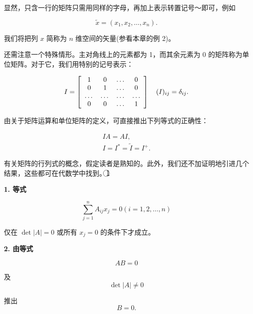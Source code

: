 显然，只含一行的矩阵只需用同样的字母，再加上表示转置记号～即可，例如

\begin{equation*}
\widetilde {x} = \left(x _ {1}, x _ {2}, \dots , x _ {n}\right).
\end{equation*}

我们将把列 $x$ 简称为 $n$ 维空间的矢量(参看本章的例 2)。

还需注意一个特殊情形。主对角线上的元素都为 1，而其余元素为 0 的矩阵称为单位矩阵。对于它，我们用特别的记号表示：

\begin{equation*}
I = \left[ \begin{array}{c c c c} 1 & 0 & \dots & 0 \\ 0 & 1 & \dots & 0 \\ \dots & \dots & \dots & \dots \\ 0 & 0 & \dots & 1 \end{array} \right] \quad (I) _ {i j} = \delta_ {i j}.
\end{equation*}

由关于矩阵运算和单位矩阵的定义，可直接推出下列等式的正确性：

\begin{equation*}
\begin{array}{c} I A = A I, \\ I = I ^ {*} = \widetilde {I} = I ^ {+}. \end{array}
\end{equation*}

有关矩阵的行列式的概念，假定读者是熟知的。此外，我们还不加证明地引进几个结果，这些都可在代数学中找到。\textcircled{1}

\textbf{1. 等式}

\begin{equation*}
\sum_ {j = 1} ^ {n} A _ {i j} x _ {j} = 0 (i = 1, 2, \dots , n)\tag{2.11}
\end{equation*}

仅在 $\operatorname{det}|A| = 0$ 或所有 $x_{j} = 0$ 的条件下才成立。

\textbf{2. 由等式}

\begin{equation*}
A B = 0\tag{2.12}
\end{equation*}

及
\begin{equation*}
\det | A | \neq 0\tag{2.13}
\end{equation*}

推出
\begin{equation*}
B = 0.\tag{2.14}
\end{equation*}

